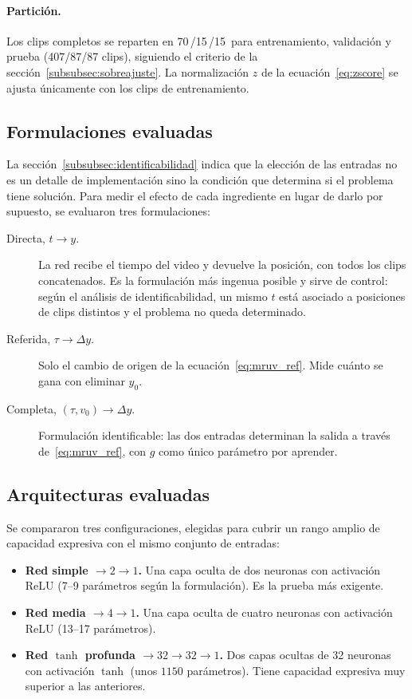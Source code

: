 \documentclass[titlepage,11pt]{article}
\providecommand{\num}[1]{\ensuremath{#1}}
\providecommand{\SI}[2]{#1\,#2}
\providecommand{\percent}{\char37\relax}
\begin{document}
\paragraph{Partición.} Los clips completos se reparten en
\SI{70}{\percent}/\SI{15}{\percent}/\SI{15}{\percent} para entrenamiento,
validación y prueba (407/87/87 clips), siguiendo el criterio de la
sección~\ref{subsubsec:sobreajuste}. La normalización $z$ de la
ecuación~\eqref{eq:zscore} se ajusta únicamente con los clips de
entrenamiento.

\subsection{Formulaciones evaluadas}
\label{subsec:formulaciones}

La sección~\ref{subsubsec:identificabilidad} indica que la elección de las
entradas no es un detalle de implementación sino la condición que determina si
el problema tiene solución. Para medir el efecto de cada ingrediente en lugar
de darlo por supuesto, se evaluaron tres formulaciones:

\begin{description}
\item[Directa, $t\to y$.] La red recibe el tiempo del video y devuelve la
  posición, con todos los clips concatenados. Es la formulación más ingenua
  posible y sirve de control: según el análisis de identificabilidad, un mismo
  $t$ está asociado a posiciones de clips distintos y el problema no queda
  determinado.
\item[Referida, $\tau\to\Delta y$.] Solo el cambio de origen de la
  ecuación~\eqref{eq:mruv_ref}. Mide cuánto se gana con eliminar $y_0$.
\item[Completa, $(\tau,v_0)\to\Delta y$.] Formulación identificable: las dos
  entradas determinan la salida a través de~\eqref{eq:mruv_ref}, con $g$ como
  único parámetro por aprender.
\end{description}

\subsection{Arquitecturas evaluadas}
\label{subsec:arquitecturas}

Se compararon tres configuraciones, elegidas para cubrir un rango amplio de
capacidad expresiva con el mismo conjunto de entradas:

\begin{itemize}
\item \textbf{Red simple $\to2\to1$.} Una capa oculta de dos neuronas con
  activación ReLU (7--9 parámetros según la formulación). Es la prueba más
  exigente.
\item \textbf{Red media $\to4\to1$.} Una capa oculta de cuatro neuronas con
  activación ReLU (13--17 parámetros).
\item \textbf{Red $\tanh$ profunda $\to32\to32\to1$.} Dos capas ocultas de 32
  neuronas con activación $\tanh$ (unos \num{1150} parámetros). Tiene capacidad
  expresiva muy superior a las anteriores.
\end{itemize}
\end{document}
